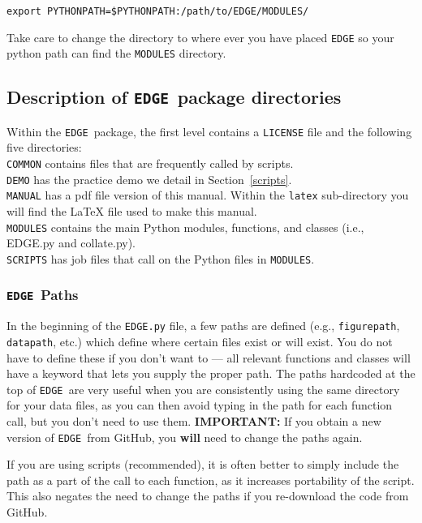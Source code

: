 \documentclass{article}
\newcommand{\edge}{\texttt{EDGE }}
\begin{document}
\vspace{2mm}
\texttt{export PYTHONPATH=\${PYTHONPATH}:/path/to/EDGE/MODULES/}
\vspace{2mm}

Take care to change the directory to where ever you have placed \texttt{EDGE} so your python path can find the \texttt{MODULES} directory.


\subsection{Description of \edge package directories} \label{edgepackage}

Within the \edge package, the first level contains a \texttt{LICENSE} file and the following five directories:\\

\noindent \texttt{COMMON} contains files that are frequently called by scripts.
\\
\noindent \texttt{DEMO} has the practice demo we detail in Section~\ref{scripts}.
\\
\noindent \texttt{MANUAL} has a pdf file version of this manual.  Within the \texttt{latex} sub-directory you will find the LaTeX file used to make this manual.
\\
\noindent \texttt{MODULES} contains the main Python modules, functions, and classes (i.e., EDGE.py and collate.py).
\\
\noindent \texttt{SCRIPTS} has job files that call on the Python files in \texttt{MODULES}.


\subsubsection{\edge Paths} \label{paths}
In the beginning of the \texttt{EDGE.py} file, a few paths are defined (e.g., \texttt{figurepath}, \texttt{datapath}, etc.) which define where certain files exist or will exist. You do not have to define these if you don’t want to — all relevant functions and classes will have a keyword that lets you supply the proper path. The paths hardcoded at the top of \edge are very useful when you are consistently using the same directory for your data files, as you can then avoid typing in the path for each function call, but you don’t need to use them. \textbf{IMPORTANT:} If you obtain a new version of \edge from GitHub, you \textbf{will} need to change the paths again. 

If you are using scripts (recommended), it is often better to simply include the path as a part of the call to each function, as it increases portability of the script. This also negates the need to change the paths if you re-download the code from GitHub.
\end{document}
